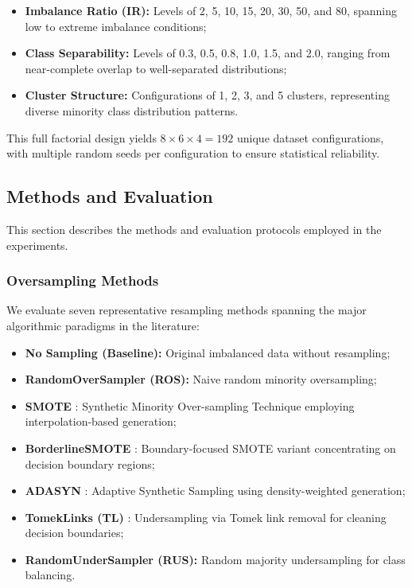 \documentclass[12pt,a4paper]{article}
\theoremstyle{definition}
\begin{document}
\begin{itemize}
 \item \textbf{Imbalance Ratio (IR):} Levels of 2, 5, 10, 15, 20, 30, 50, and 80, spanning low to extreme imbalance conditions;
 \item \textbf{Class Separability:} Levels of 0.3, 0.5, 0.8, 1.0, 1.5, and 2.0, ranging from near-complete overlap to well-separated distributions;
 \item \textbf{Cluster Structure:} Configurations of 1, 2, 3, and 5 clusters, representing diverse minority class distribution patterns.
\end{itemize}

This full factorial design yields $8 \times 6 \times 4 = 192$ unique dataset configurations, with multiple random seeds per configuration to ensure statistical reliability.

\subsection{Methods and Evaluation}
This section describes the methods and evaluation protocols employed in the experiments.

\subsubsection{Oversampling Methods}
We evaluate seven representative resampling methods spanning the major algorithmic paradigms in the literature:

\begin{itemize}
 \item \textbf{No Sampling (Baseline):} Original imbalanced data without resampling;
 \item \textbf{RandomOverSampler (ROS):} Naive random minority oversampling;
 \item \textbf{SMOTE} : Synthetic Minority Over-sampling Technique employing interpolation-based generation;
 \item \textbf{BorderlineSMOTE} : Boundary-focused SMOTE variant concentrating on decision boundary regions;
 \item \textbf{ADASYN} : Adaptive Synthetic Sampling using density-weighted generation;
 \item \textbf{TomekLinks (TL)} \cite{tomek1976two}: Undersampling via Tomek link removal for cleaning decision boundaries;
 \item \textbf{RandomUnderSampler (RUS):} Random majority undersampling for class balancing.
\end{itemize}
\end{document}
